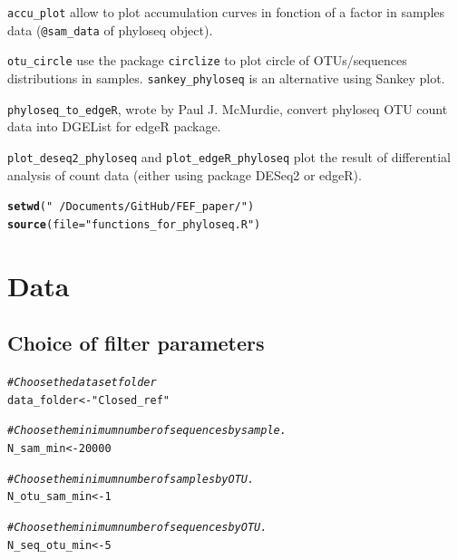 \documentclass[12pt]{article}\usepackage[]{graphicx}\usepackage[]{color}
\makeatletter
\newcommand{\hlnum}[1]{\textcolor[rgb]{0.686,0.059,0.569}{#1}}%
\newcommand{\hlstr}[1]{\textcolor[rgb]{0.192,0.494,0.8}{#1}}%
\newcommand{\hlcom}[1]{\textcolor[rgb]{0.678,0.584,0.686}{\textit{#1}}}%
\newcommand{\hlstd}[1]{\textcolor[rgb]{0.345,0.345,0.345}{#1}}%
\newcommand{\hlkwb}[1]{\textcolor[rgb]{0.69,0.353,0.396}{#1}}%
\newcommand{\hlkwc}[1]{\textcolor[rgb]{0.333,0.667,0.333}{#1}}%
\newcommand{\hlkwd}[1]{\textcolor[rgb]{0.737,0.353,0.396}{\textbf{#1}}}%
\newenvironment{kframe}{%
 \def\at@end@of@kframe{}%
 \ifinner\ifhmode%
  \def\at@end@of@kframe{\end{minipage}}%
  \begin{minipage}{\columnwidth}%
 \fi\fi%
 \def\FrameCommand##1{\hskip\@totalleftmargin \hskip-\fboxsep
 \colorbox{shadecolor}{##1}\hskip-\fboxsep
     \hskip-\linewidth \hskip-\@totalleftmargin \hskip\columnwidth}%
 \MakeFramed {\advance\hsize-\width
   \@totalleftmargin\z@ \linewidth\hsize
   \@setminipage}}%
 {\par\unskip\endMakeFramed%
 \at@end@of@kframe}
\newenvironment{knitrout}{}{} %
\numberwithin{figure}{section}
\makeatother
\begin{document}
\texttt{accu\_plot} allow to plot accumulation curves in fonction of a factor in samples data (\texttt{@sam\_data} of phyloseq object).

\texttt{otu\_circle} use the package \texttt{circlize} to plot circle of OTUs/sequences distributions in samples. \texttt{sankey\_phyloseq} is an alternative using Sankey plot.

\texttt{phyloseq\_to\_edgeR}, wrote by Paul J. McMurdie, convert phyloseq OTU count data into DGEList for edgeR package.

\texttt{plot\_deseq2\_phyloseq} and \texttt{plot\_edgeR\_phyloseq} plot the result of differential analysis of count data (either using package DESeq2 or edgeR).

\begin{knitrout}\small
{}\color{fgcolor}\begin{kframe}
\begin{alltt}
\hlkwd{setwd}\hlstd{(}\hlstr{"~/Documents/GitHub/FEF_paper/"}\hlstd{)}
\hlkwd{source}\hlstd{(}\hlkwc{file} \hlstd{=} \hlstr{"functions_for_phyloseq.R"}\hlstd{)}
\end{alltt}
\end{kframe}
\end{knitrout}


\section{Data}
  
  \subsection{Choice of filter parameters}
  \label{section:filter}
\begin{knitrout}\small
{}\color{fgcolor}\begin{kframe}
\begin{alltt}
\hlcom{#Choose the dataset folder}
\hlstd{data_folder} \hlkwb{<-} \hlstr{"Closed_ref"}

\hlcom{#Choose the minimum number of sequences by sample.}
\hlstd{N_sam_min} \hlkwb{<-} \hlnum{20000}

\hlcom{#Choose the minimum number of samples by OTU.}
\hlstd{N_otu_sam_min} \hlkwb{<-} \hlnum{1}

\hlcom{#Choose the minimum number of sequences by OTU.}
\hlstd{N_seq_otu_min} \hlkwb{<-} \hlnum{5}
\end{alltt}
\end{kframe}
\end{knitrout}
\end{document}
